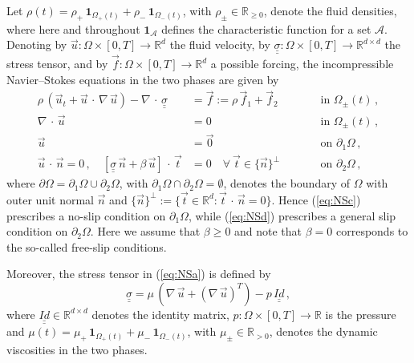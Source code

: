 \documentclass[a4paper,11pt, onecolumn]{article}
\begin{document}
Let $\rho(t) = \rho_+\,\mathbf{1}_{\Omega_+(t)} +
\rho_-\,\mathbf{1}_{\Omega_-(t)}$, with $\rho_\pm \in \mathbb{R}_{\geq0}$,
denote the fluid densities, where here and throughout $\mathbf{1}_{\mathcal{A}}$
defines the characteristic function for a set $\mathcal{A}$. Denoting by $\vec u
: \Omega \times [0, T] \to \mathbb{R}^d$ the fluid velocity, by
$\underline{\underline{\sigma}} : \Omega \times [0,T] \to \mathbb{R}^{d \times
d}$ the stress tensor, and by $\vec f : \Omega \times [0, T] \to \mathbb{R}^d$ a
possible forcing, the incompressible Navier--Stokes equations in the two phases
are given by
\begin{subequations}
 \begin{alignat}{2}
  \rho\,(\vec u_t + \vec u \,\cdot\,\nabla\,\vec u)
  - \nabla\,\cdot\,\underline{\underline{\sigma}} & = \vec f := \rho\,\vec f_1
  + \vec f_2 \qquad &&\mbox{in }
  \Omega_\pm(t)\,, \label{eq:NSa} \\
  \nabla\,\cdot\,\vec u & = 0 \qquad &&\mbox{in } \Omega_\pm(t)\,,
  \label{eq:NSb} \\
  \vec u & = \vec 0 \qquad &&\mbox{on } \partial_1\Omega\,, \label{eq:NSc} \\
  \vec u \,\cdot\,\vec{n} = 0\,,\quad
  [\underline{\underline{\sigma}}\,\vec{n} + \beta\,\vec u]\,\cdot\,\vec{t}& = 0
  \quad\forall\ \vec{t} \in \{\vec{n}\}^\perp
  \qquad &&\mbox{on } \partial_2\Omega\,,
  \label{eq:NSd}
 \end{alignat}
\end{subequations}
where $\partial\Omega =\partial_1\Omega \cup \partial_2\Omega$, with
$\partial_1\Omega \cap \partial_2\Omega =\emptyset$, denotes the boundary of
$\Omega$ with outer unit normal $\vec{n}$ and $\{\vec{n}\}^\perp := \{ \vec{t}
\in \mathbb{R}^d : \vec{t} \,\cdot\,\vec{n} = 0\}$. Hence (\ref{eq:NSc})
prescribes a no-slip condition on $\partial_1\Omega$, while (\ref{eq:NSd})
prescribes a general slip condition on $\partial_2\Omega$. Here we assume that
$\beta \geq 0$ and note that $\beta = 0$ corresponds to the so-called free-slip
conditions.

Moreover, the stress tensor in (\ref{eq:NSa}) is defined by
\begin{equation} \label{eq:sigma}
 \underline{\underline{\sigma}} = \mu \,(\nabla\,\vec u + (\nabla\,\vec u)^T) -
 p\,\underline{\underline{Id}}\,,
\end{equation}
where $\underline{\underline{Id}} \in \mathbb{R}^{d \times d}$ denotes the
identity matrix, $p : \Omega \times [0, T] \to \mathbb{R}$ is the pressure and
$\mu(t) = \mu_+\,\mathbf{1}_{\Omega_+(t)} + \mu_-\,\mathbf{1}_{\Omega_-(t)}$,
with $\mu_\pm \in \mathbb{R}_{>0}$, denotes the dynamic viscosities in the two
phases.
\newline
\end{document}
